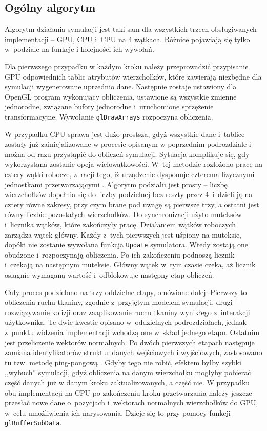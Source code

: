 		\subsection{Ogólny algorytm}
		\label{t:symulacja:dzialanie:algorytm}
		
		Algorytm działania symulacji jest taki sam dla wszystkich trzech obsługiwanych implementacji -- GPU, CPU i~CPU na 4 wątkach. Różnice pojawiają się tylko w~podziale na funkcje i kolejności ich wywołań. 
		
		Dla pierwszego przypadku w każdym kroku należy przeprowadzić przypisanie GPU odpowiednich tablic atrybutów wierzchołków, które zawierają niezbędne dla symulacji wygenerowane uprzednio dane. Następnie zostaje ustawiony dla OpenGL program wykonujący obliczenia, ustawione są wszystkie zmienne jednorodne, związane bufory jednorodne i~uruchomione sprzężenie transformacyjne. Wywołanie \texttt{glDrawArrays} rozpoczyna obliczenia. 
		
		W przypadku CPU sprawa jest dużo prostsza, gdyż wszystkie dane i~tablice zostały już zainicjalizowane w procesie opisanym w poprzednim podrozdziale i można od razu przystąpić do obliczeń symulacji. Sytuacja komplikuje się, gdy wykorzystana zostanie opcja wielowątkowości. W~tej metodzie rozłożono pracę na cztery wątki robocze, z~racji tego, iż urządzenie dysponuje czterema fizycznymi jednostkami przetwarzającymi \cite{specs}. Algorytm podziału jest prosty -- liczbę wierzchołków dopełnia się do liczby podzielnej bez reszty przez 4~i~dzieli ją na cztery równe zakresy, przy czym brane pod uwagę są pierwsze trzy, a ostatni jest równy liczbie pozostałych wierzchołków. Do synchronizacji użyto muteksów i~licznika wątków, które zakończyły pracę. Działaniem wątków roboczych zarządza wątek główny. Każdy z~tych pierwszych jest uśpiony na muteksie, dopóki nie zostanie wywołana funkcja \texttt{Update} symulatora. Wtedy zostają one obudzone i~rozpoczynają obliczenia. Po ich zakończeniu podnoszą licznik i~czekają na następnym muteksie. Główny wątek w~tym czasie czeka, aż licznik osiągnie wymaganą wartość i~odblokowuje następny etap obliczeń.
		
		Cały proces podzielono na trzy oddzielne etapy, omówione dalej. Pierwszy to obliczenia ruchu tkaniny, zgodnie z~przyjętym modelem symulacji, drugi -- rozwiązywanie kolizji oraz zaaplikowanie ruchu tkaniny wynikłego z~interakcji użytkownika. Te dwie kwestie opisano w~oddzielnych podrozdziałach, jednak z~punktu widzenia implementacji wchodzą one w~skład jednego etapu. Ostatnim jest przeliczenie wektorów normalnych. Po dwóch pierwszych etapach następuje zamiana identyfikatorów struktur danych wejściowych i wyjściowych, zastosowano tu tzw. metodę ping-pongową \cite{receptury}. Gdyby tego nie robić, efektem byłby szybki ,,wybuch'' symulacji, gdyż obliczenia na danym wierzchołku mogłyby pobierać część danych już w danym kroku zaktualizowanych, a część nie. W przypadku obu implementacji na CPU po zakończeniu kroku przetwarzania należy jeszcze przesłać nowe dane o~pozycjach i~wektorach normalnych wierzchołków do GPU, w~celu umożliwienia ich narysowania. Dzieje się to przy pomocy funkcji \texttt{glBufferSubData}.
		
